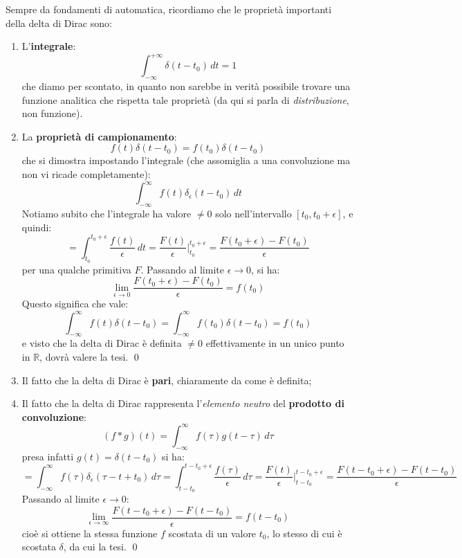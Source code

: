 \documentclass[a4paper,11pt]{article}
\begin{document}
Sempre da fondamenti di automatica, ricordiamo che le proprietà importanti della delta di Dirac sono:
\begin{enumerate}
	\item L'\textbf{integrale}:		
		$$
		\int_{-\infty}^{+\infty} \delta(t - t_0) \, dt = 1
		$$
		che diamo per scontato, in quanto non sarebbe in verità possibile trovare una funzione analitica che rispetta tale proprietà (da qui si parla di \textit{distribuzione}, non funzione).
	\item La \textbf{proprietà di campionamento}:	
		$$
		f(t) \delta(t - t_0) = f(t_0) \delta(t - t_0)
		$$
		che si dimostra impostando l'integrale (che assomiglia a una convoluzione ma non vi ricade completamente):
		$$
		\int_{-\infty}^\infty f(t) \delta_\epsilon (t - t_0) \, dt
		$$
		Notiamo subito che l'integrale ha valore $\neq 0$ solo nell'intervallo $[t_0, t_0 + \epsilon]$, e quindi:
		$$
		= \int_{t_0}^{t_0 + \epsilon} \frac{f(t)}{\epsilon} \, dt = \frac{F(t)}{\epsilon} \Bigg|^{t_0 + \epsilon}_{t_0} = \frac{F(t_0 + \epsilon) - F(t_0)}{\epsilon}
		$$
		per una qualche primitiva $F$. Passando al limite $\epsilon \rightarrow 0$, si ha:
		$$
		\lim_{\epsilon \rightarrow 0} \frac{F(t_0 + \epsilon) - F(t_0)}{\epsilon} = f(t_0)
		$$
		Questo significa che vale:
		$$
		\int_{-\infty}^{\infty} f(t) \delta(t - t_0) = \int_{-\infty}^{\infty} f(t_0) \delta(t - t_0) = f(t_0)
		$$
		e visto che la delta di Dirac è definita $\neq 0$ effettivamente in un unico punto in $\mathbb{R}$, dovrà valere la tesi. \qed
	\item Il fatto che la delta di Dirac è \textbf{pari}, chiaramente da come è definita;
	\item Il fatto che la delta di Dirac rappresenta l'\textit{elemento neutro} del \textbf{prodotto di convoluzione}:
		$$
		(f * g)(t) = \int_{-\infty}^{\infty} f(\tau) g(t - \tau) \, d\tau
		$$
		presa infatti $g(t) = \delta(t - t_0)$ si ha:
		$$
		= \int_{-\infty}^{\infty} f(\tau) \delta_\epsilon (\tau - t + t_0) \, d\tau = \int_{t - t_0}^{t - t_0 + \epsilon} \frac{f(\tau)}{\epsilon} \, d\tau = \frac{F(t)}{\epsilon} \Bigg|^{t - t_0 + \epsilon}_{t - t_0} = \frac{F(t - t_0 + \epsilon) - F(t - t_0)}{\epsilon}
		$$
		Passando al limite $\epsilon \rightarrow 0$:
		$$
		\lim_{\epsilon \rightarrow \infty} \frac{F(t - t_0 + \epsilon) - F(t - t_0)}{\epsilon} = f(t - t_0)
		$$
		cioè si ottiene la stessa funzione $f$ scostata di un valore $t_0$, lo stesso di cui è scostata $\delta$, da cui la tesi. \qed
\end{enumerate}
\end{document}
